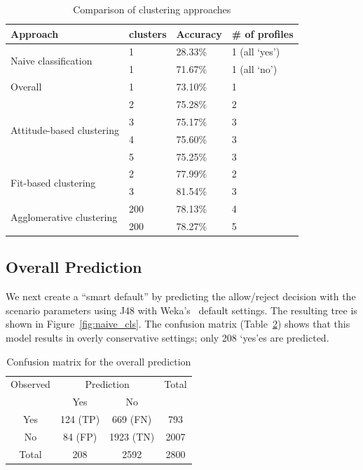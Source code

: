 \begin{table}
	\centering
	\caption{Comparison of clustering approaches}
	\label{tab:comp_approach}
	\begin{tabular}{  l |  l |  l | l}
		\hline
		Approach & clusters & Accuracy & \# of profiles \\ \hline
		\multirow{2}{6em}{Naive classification} & 1 & 28.33\% & 1  (all `yes')\\ %
		& 1 & 71.67\% & 1 (all `no') \\ \hline
		Overall & 1 & 73.10\% & 1 \\ \hline 
		\multirow{4}{6em}{Attitude-based clustering} & 2 & 75.28\% & 2 \\ %
		& 3 & 75.17\% & 3 \\ %
		& 4 & 75.60\% & 3 \\ %
		& 5 & 75.25\% & 3 \\ \hline
		\multirow{2}{6em}{Fit-based clustering} & 2 & 77.99\% & 2 \\ %
		& 3 & 81.54\% & 3 \\ \hline
		\multirow{2}{7em}{Agglomerative  clustering} & 200 & 78.13\% & 4 \\ %
		& 200 & 78.27\% & 5 \\ \hline %
	\end{tabular}
\end{table}

\subsection{Overall Prediction}
We next create a ``smart default'' by predicting the allow/reject decision with the scenario parameters using J48 with Weka's~\cite{hall2009weka} default settings. The resulting tree is shown in Figure~\ref{fig:naive_cls}. The confusion matrix (Table~\ref{tab:confusion_matrix}) shows that this model results in overly conservative settings; only 208 `yes'es are predicted.

\begin{table}
	\centering
	\caption{Confusion matrix for the overall prediction}
	\label{tab:confusion_matrix}
	\begin{tabular}{c|c|c|c} \hline
		Observed &\multicolumn{2}{c|}{Prediction} & Total\\ \cline{2-3}
		& Yes     & No       &  \\ \hline
		Yes   & 124 (TP) & 669 (FN)  & 793   \\ \hline
		No    & 84 (FP)  & 1923 (TN) & 2007  \\ \hline
		Total & 208     & 2592     & 2800  \\ \hline
	\end{tabular}
\end{table}

